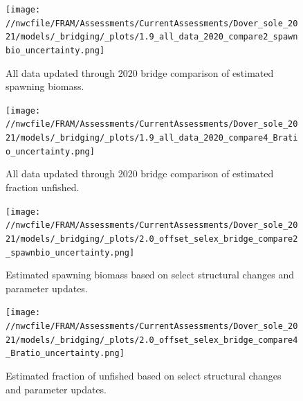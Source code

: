 \documentclass[11pt,
  english,
  a4paper,
]{article}
\begin{document}
\begin{figure}
\centering
\texttt{[image: //nwcfile/FRAM/Assessments/CurrentAssessments/Dover\_sole\_2021/models/\_bridging/\_plots/1.9\_all\_data\_2020\_compare2\_spawnbio\_uncertainty.png]}
\caption{All data updated through 2020 bridge comparison of estimated spawning biomass.\label{fig:all-data-bridge-ssb}}
\end{figure}

\tagmcend\tagstructend


\begin{figure}
\centering
\texttt{[image: //nwcfile/FRAM/Assessments/CurrentAssessments/Dover\_sole\_2021/models/\_bridging/\_plots/1.9\_all\_data\_2020\_compare4\_Bratio\_uncertainty.png]}
\caption{All data updated through 2020 bridge comparison of estimated fraction unfished.\label{fig:all-data-bridge-depl}}
\end{figure}

\tagmcend\tagstructend


\begin{figure}
\centering
\texttt{[image: //nwcfile/FRAM/Assessments/CurrentAssessments/Dover\_sole\_2021/models/\_bridging/\_plots/2.0\_offset\_selex\_bridge\_compare2\_spawnbio\_uncertainty.png]}
\caption{Estimated spawning biomass based on select structural changes and parameter updates.\label{fig:structure-bridge-ssb}}
\end{figure}

\tagmcend\tagstructend


\begin{figure}
\centering
\texttt{[image: //nwcfile/FRAM/Assessments/CurrentAssessments/Dover\_sole\_2021/models/\_bridging/\_plots/2.0\_offset\_selex\_bridge\_compare4\_Bratio\_uncertainty.png]}
\caption{Estimated fraction of unfished based on select structural changes and parameter updates.\label{fig:structure-bridge-depl}}
\end{figure}

\tagmcend\tagstructend
\end{document}
